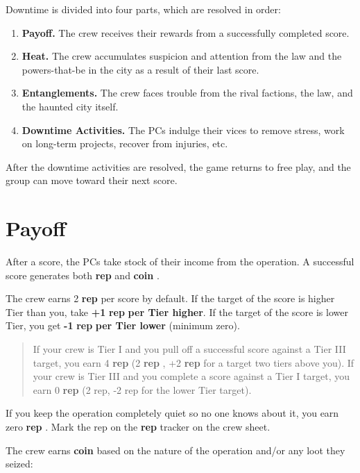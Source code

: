 \documentclass[11pt,oneside]{book}
\newcommand{\gameterm}[1]{\textbf{#1}}
\begin{document}
Downtime is divided into four parts, which are resolved in order:
\begin{enumerate}
	\item \gameterm{Payoff. } The crew receives their rewards from a successfully completed score.
	\item \gameterm{Heat. } The crew accumulates suspicion and attention from the law and the powers-that-be in the city as a result of their last score.
	\item \gameterm{Entanglements.}  The crew faces trouble from the rival factions, the law, and the haunted city itself.
	\item \gameterm{Downtime Activities.}  The PCs indulge their vices to remove stress, work on long-term projects, recover from injuries, etc.
\end{enumerate}

After the downtime activities are resolved, the game returns to free play, and the group can move toward their next score.

\chapter{Payoff}

After a score, the PCs take stock of their income from the operation. A successful score generates both \gameterm{rep}  and \gameterm{coin} .

The crew earns 2 \gameterm{rep}  per score by default. If the target of the score is higher Tier than you, take \textbf{+1 }\gameterm{rep} \textbf{ per Tier higher}. If the target of the score is lower Tier, you get \textbf{-1 }\gameterm{rep} \textbf{ per Tier lower} (minimum zero).

\begin{quote}
	If your crew is Tier I and you pull off a successful score against a Tier III target, you earn 4 \gameterm{rep}  (2 \gameterm{rep} , +2 \gameterm{rep}  for a target two tiers above you). If your crew is Tier III and you complete a score against a Tier I target, you earn 0 \gameterm{rep}  (2 rep, -2 rep for the lower Tier target).
\end{quote} 

If you keep the operation completely quiet so no one knows about it, you earn zero \gameterm{rep} . Mark the rep on the \gameterm{rep}  tracker on the crew sheet.

The crew earns \gameterm{coin}  based on the nature of the operation and/or any loot they seized:
\end{document}
